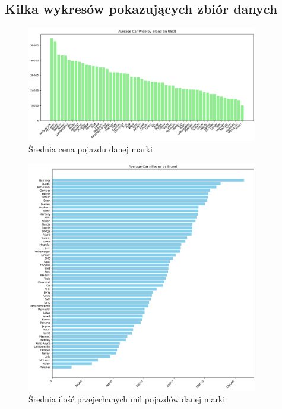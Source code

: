 \documentclass[12pt, a4paper]{report}
\begin{document}
    \subsection*{Kilka wykresów pokazujących zbiór danych}
    \begin{figure}[H]
    \centering
    \includegraphics[width=0.9\textwidth]{images/avg_car_price_by_brand.png}
    \caption{Średnia cena pojazdu danej marki}
    \end{figure}
    \begin{figure}[H]
    \centering
    \includegraphics[width=0.9\textwidth]{images/avg_mileage_by_car_brand.png}
    \caption{Średnia ilość przejechanych mil pojazdów danej marki}
    \end{figure}
\end{document}
